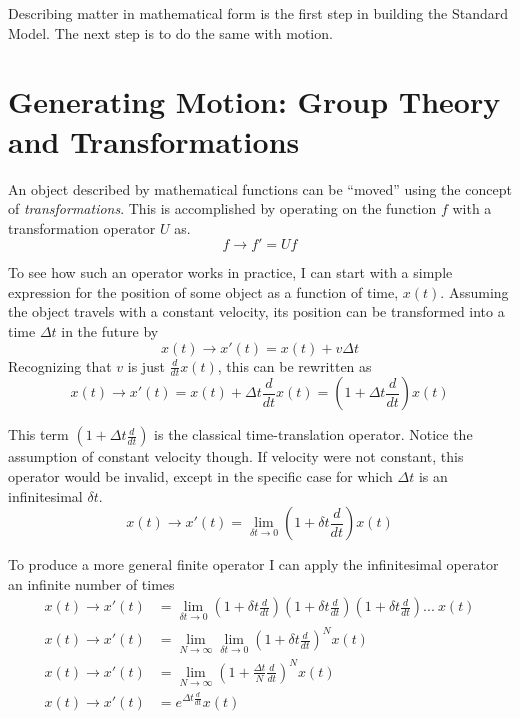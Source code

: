     Describing matter in mathematical form is the first step in building the Standard Model.
    The next step is to do the same with motion.


\section{Generating Motion: Group Theory and Transformations} \label{sec:group_theory}

    An object described by mathematical functions can be ``moved'' using the concept of \textit{transformations}.
    This is accomplished by operating on the function $f$ with a transformation operator $U$ as.
    \begin{equation}
    f \to f' = U f
    \end{equation}

    To see how such an operator works in practice,
        I can start with a simple expression for the position of some object as a function of time, $x(t)$.
    Assuming the object travels with a constant velocity,
        its position can be transformed into a time $\Delta t$ in the future by
    \begin{equation}
    x(t) \to x'(t) = x(t) + v \Delta t
    \end{equation}
    Recognizing that $v$ is just $\frac{d}{dt} x(t)$, this can be rewritten as
    \begin{equation}
    x(t) \to x'(t) = x(t) + \Delta t \frac{d}{dt} x(t) = \left(1+\Delta t \frac{d}{dt}\right) x(t)
    \end{equation}

    This term $\left(1+\Delta t \frac{d}{dt}\right)$ is the classical time-translation operator.
    Notice the assumption of constant velocity though.
    If velocity were not constant, this operator would be invalid,
        except in the specific case for which $\Delta t$ is an infinitesimal $\delta t$.
    \begin{equation}
    x(t) \to x'(t) = \lim_{\delta t \to 0} \left(1+\delta t \frac{d}{dt}\right) x(t)
    \end{equation}

    To produce a more general finite operator I can apply the infinitesimal operator an infinite number of times
    \begin{equation} \begin{split}
    x(t) \to x'(t) &= \lim_{\delta t \to 0} \left(1+\delta t \frac{d}{dt}\right)\left(1+\delta t \frac{d}{dt}\right)\left(1+\delta t \frac{d}{dt}\right)...\ x(t)
    \\x(t) \to x'(t) &= \lim_{N \to \infty} \lim_{\delta t \to 0} \left(1+\delta t \frac{d}{dt}\right)^N x(t)
    \\x(t) \to x'(t) &= \lim_{N \to \infty} \left(1+\frac{\Delta t}{N} \frac{d}{dt}\right)^N x(t)
    \\x(t) \to x'(t) &= e^{\Delta t \frac{d}{dt}} x(t)
    \end{split} \end{equation}

